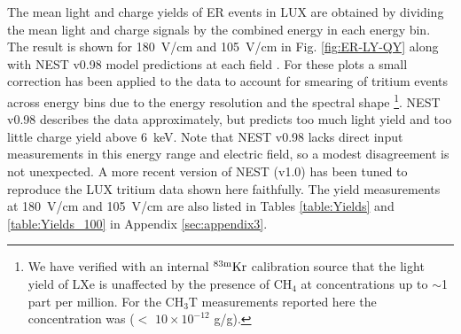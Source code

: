 The mean light and charge yields of ER events in LUX are obtained by dividing the mean light and charge signals by the combined energy in each energy bin. The result is shown for 180~V/cm and 105~V/cm in Fig. \ref{fig:ER-LY-QY} along with NEST v0.98 model predictions at each field \cite{NEST_2013}. For these plots a small correction has been applied to the data to account for smearing of tritium events across energy bins due to the energy resolution and the spectral shape \cite{Dobi_Thesis}\footnote{We have verified with an internal $\rm ^{83m}Kr$ calibration source that the light yield of LXe is unaffected by the presence of CH$_4$ at concentrations up to $\sim$1 part per million. For the CH$_3$T measurements reported here the concentration was ($<$ $10\times10^{-12}$ g/g). }.  NEST v0.98 describes the data approximately, but predicts too much light yield and too little charge yield above 6~keV. Note that NEST v0.98 lacks direct input measurements in this energy range and electric field, so a modest disagreement is not unexpected. A more recent version of NEST (v1.0) has been tuned to reproduce the LUX tritium data shown here faithfully. The yield measurements at 180~V/cm and 105~V/cm are also listed in Tables \ref{table:Yields} and \ref{table:Yields_100} in Appendix \ref{sec:appendix3}.

